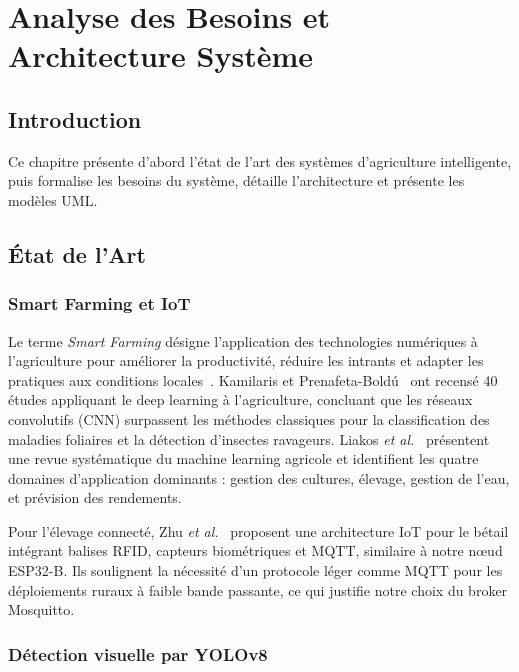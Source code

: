 \documentclass[12pt,a4paper,twoside]{report}
\newcounter{hi}
\begin{document}
\chapter{Analyse des Besoins et Architecture Système}
\section*{Introduction}
Ce chapitre présente d'abord l'état de l'art des systèmes d'agriculture
intelligente, puis formalise les besoins du système, détaille l'architecture
et présente les modèles UML.

\section{État de l'Art}

\subsection{Smart Farming et IoT}

Le terme \textit{Smart Farming} désigne l'application des technologies
numériques à l'agriculture pour améliorer la productivité, réduire les
intrants et adapter les pratiques aux conditions locales~\cite{sharma2024smart}.
Kamilaris et Prenafeta-Boldú~\cite{kamilaris2018} ont recensé 40 études
appliquant le deep learning à l'agriculture, concluant que les réseaux
convolutifs (CNN) surpassent les méthodes classiques pour la classification
des maladies foliaires et la détection d'insectes ravageurs. Liakos
\textit{et al.}~\cite{liakos2018} présentent une revue systématique du
machine learning agricole et identifient les quatre domaines d'application
dominants : gestion des cultures, élevage, gestion de l'eau, et prévision
des rendements.

Pour l'élevage connecté, Zhu \textit{et al.}~\cite{zhuvit2023iot} proposent
une architecture IoT pour le bétail intégrant balises RFID, capteurs
biométriques et MQTT, similaire à notre nœud ESP32-B. Ils soulignent la
nécessité d'un protocole léger comme MQTT pour les déploiements ruraux à
faible bande passante, ce qui justifie notre choix du broker Mosquitto.

\subsection{Détection visuelle par YOLOv8}
\end{document}
